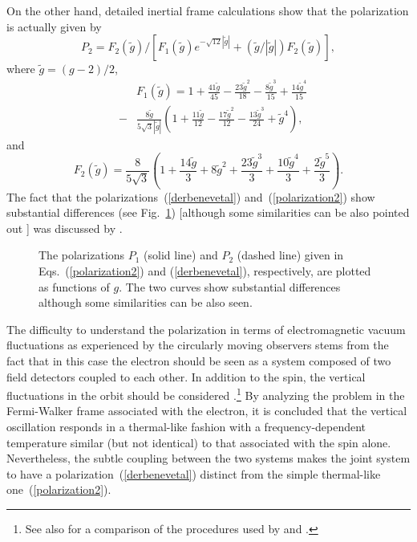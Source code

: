 \documentclass[12pt,nofootinbib,floatfix,aps,prd,showpacs,amsmath,amssymb,eqsecnum]{revtex4-2}
\begin{document}
On the other hand, detailed inertial frame
calculations \cite{Derbenevetal73, Jackson76} 
show that the polarization is actually given by 
\begin{equation}
P_2= 
F_2(\tilde g )/
[F_1(\tilde g) e^{-\sqrt{12} |\tilde g|} + (\tilde g/|\tilde g|) F_2(\tilde g) ],
\label{derbenevetal}
\end{equation}
where 
$
\tilde g = (g-2)/2
$,
\begin{eqnarray}
& & 
F_1(\tilde g) 
= 
1+ \frac{41 \tilde g}{45} - \frac{23 \tilde g^2}{18} 
 - \frac{8 \tilde g^3}{15} +\frac{14 \tilde g^4}{15} 
\nonumber \\
& -&
\frac{8 \tilde g }{5 \sqrt{3} |\tilde g|} 
\left( 
1+ \frac{11 \tilde g }{12} - \frac{17 \tilde g^2}{12} 
 - \frac{13 \tilde g^3}{24} + \tilde g^4
\right),
\end{eqnarray}
and
\begin{equation}
F_2(\tilde g) =
\frac{8 }{5 \sqrt{3} }
\left( 
1+ \frac{14 \tilde g }{3} +8 \tilde g^2 
 + \frac{23 \tilde g^3}{3} + \frac{10 \tilde g^4}{3} +\frac{2 \tilde g^5}{3}
\right).
\end{equation}
The fact that the polarizations~(\ref{derbenevetal}) and~(\ref{polarization2})
show substantial differences (see Fig.~\ref{polarizationfig}) [although some 
similarities can be also pointed out \cite{Belletal83}] was discussed 
by \textcite{Unruh98, Unruh99}. 
\begin{figure}
\begin{center}
\mbox{}
\end{center}
\caption{The polarizations $P_1$ (solid line) and $P_2$ (dashed line) given 
in Eqs.~(\ref{polarization2}) and (\ref{derbenevetal}), respectively, are 
plotted as functions of $g$. The two curves show substantial differences
although some similarities can be also seen.}
\label{polarizationfig}
\end{figure}
The difficulty to understand the polarization 
in terms of electromagnetic vacuum fluctuations as experienced 
by the circularly moving observers stems from the fact that 
in this case the electron should be seen as a system composed of two 
field detectors coupled to each other. In addition 
to the spin, the vertical fluctuations in the orbit should be
considered \cite{Belletal87, Leinaas99, Leinaas02}.\footnote{ 
See also \textcite{Barberetal88} for a comparison 
of the procedures used by \textcite{Belletal87} and 
\textcite{Derbenevetal73}.                                }  
By analyzing the problem in the Fermi-Walker frame associated 
with the electron, it is concluded that the vertical oscillation 
responds in a thermal-like 
fashion with a frequency-dependent 
temperature similar (but not identical) 
to that associated with the spin alone. 
Nevertheless, the subtle coupling between the two systems makes
the joint system to have a polarization~(\ref{derbenevetal})
distinct from the simple thermal-like one~(\ref{polarization2}). 
\end{document}
